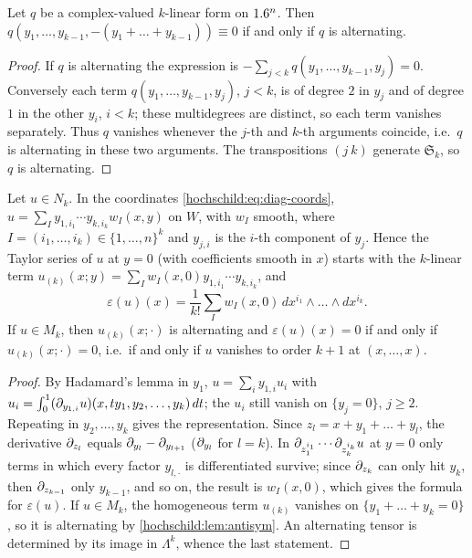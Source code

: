 \begin{lemma}\label{hochschild:lem:antisym}
Let $q$ be a complex-valued $k$-linear form on $1.6^n$. Then
$q(y_1,\dots,y_{k-1},-(y_1+\dots+y_{k-1}))\equiv0$ if and only if $q$ is
alternating.
\end{lemma}
\begin{proof}
If $q$ is alternating the expression is
$-\sum_{j<k}q(y_1,\dots,y_{k-1},y_j)=0$. Conversely each term
$q(y_1,\dots,y_{k-1},y_j)$, $j<k$, is of degree $2$ in $y_j$ and of degree $1$
in the other $y_i$, $i<k$; these multidegrees are distinct, so each term
vanishes separately. Thus $q$ vanishes whenever the $j$-th and $k$-th
arguments coincide, i.e.\ $q$ is alternating in these two arguments. The
transpositions $(j\ k)$ generate $\mathfrak S_k$, so $q$ is alternating.
\end{proof}

\begin{lemma}\label{hochschild:lem:leading}
Let $u\in N_k$. In the coordinates \eqref{hochschild:eq:diag-coords},
$u=\sum_Iy_{1,i_1}\cdots y_{k,i_k}w_I(x,y)$ on $W$, with $w_I$ smooth, where
$I=(i_1,\dots,i_k)\in\{1,\dots,n\}^k$ and $y_{j,i}$ is the $i$-th component of
$y_j$. Hence the Taylor series of $u$ at $y=0$ (with coefficients smooth in
$x$) starts with the $k$-linear term $u_{(k)}(x;y)=\sum_Iw_I(x,0)y_{1,i_1}\cdots
y_{k,i_k}$, and
\begin{equation*}
  \varepsilon(u)(x)=\frac1{k!}\sum_Iw_I(x,0)\,dx^{i_1}\wedge\dots\wedge dx^{i_k}.
\end{equation*}
If $u\in M_k$, then $u_{(k)}(x;\cdot)$ is alternating and $\varepsilon(u)(x)=0$
if and only if $u_{(k)}(x;\cdot)=0$, i.e.\ if and only if $u$ vanishes to
order $k+1$ at $(x,\dots,x)$.
\end{lemma}
\begin{proof}
By Hadamard's lemma in $y_1$, $u=\sum_iy_{1,i}u_i$ with
$u_i=\int_0^1(\partial_{y_{1,i}}u)(x,ty_1,y_2,\dots,y_k)\,dt$; the $u_i$ still
vanish on $\{y_j=0\}$, $j\ge2$. Repeating in $y_2,\dots,y_k$ gives the
representation. Since $z_l=x+y_1+\dots+y_l$, the derivative $\partial_{z_l}$
equals $\partial_{y_l}-\partial_{y_{l+1}}$ ($\partial_{y_l}$ for $l=k$). In
$\partial_{z_1^{i_1}}\cdots\partial_{z_k^{i_k}}u$ at $y=0$ only terms in which every
factor $y_{l,\cdot}$ is differentiated survive; since $\partial_{z_k}$ can only hit
$y_k$, then $\partial_{z_{k-1}}$ only $y_{k-1}$, and so on, the result is
$w_I(x,0)$, which gives the formula for $\varepsilon(u)$. If $u\in M_k$, the
homogeneous term $u_{(k)}$ vanishes on $\{y_1+\dots+y_k=0\}$, so it is
alternating by \cref{hochschild:lem:antisym}. An alternating tensor is
determined by its image in $\Lambda^k$, whence the last statement.
\end{proof}

